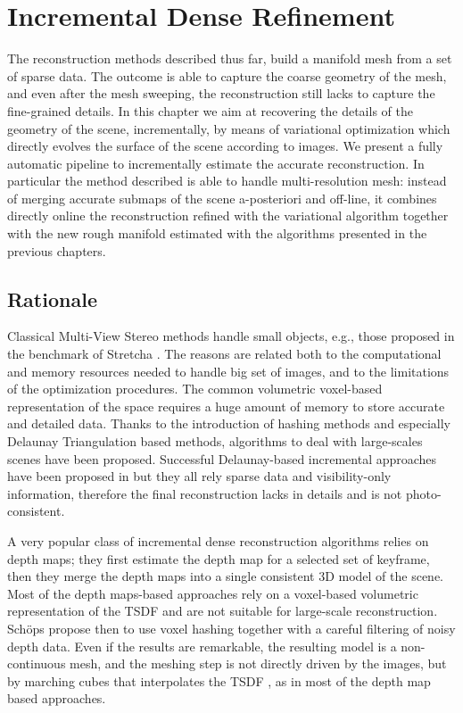 \chapter{Incremental Dense Refinement}
\label{ch:incrDenseRef}
The reconstruction methods described thus far, build a manifold mesh from a set of sparse data. 
The outcome is able to capture the coarse geometry of the mesh, and even after the mesh sweeping, the reconstruction still lacks to capture the fine-grained details.
In this chapter we aim at recovering the details of the geometry of the scene, incrementally, by means of variational optimization which directly evolves the surface of the scene according to images. 
We present a fully automatic pipeline to incrementally estimate the accurate reconstruction. In particular the method described is able to handle multi-resolution mesh: instead of merging accurate submaps of the scene a-posteriori and off-line, it combines directly online the reconstruction refined with the variational algorithm together with the new rough manifold estimated with the algorithms presented in the previous chapters.

\minitoc

\section{Rationale}

Classical Multi-View Stereo methods \cite{gargallo2005bayesian,delaunoy_et_al_08} handle small objects, e.g., those proposed in the benchmark of Stretcha \etal \cite{strecha2006combined}.
The reasons are related both to the computational and memory resources needed to handle big set of images, and to the limitations of the optimization procedures.
The common volumetric voxel-based representation of the space requires a huge amount of memory to store accurate and detailed data.
Thanks to the introduction of hashing methods and especially  Delaunay Triangulation based methods, algorithms to deal with large-scales scenes have been proposed.
Successful Delaunay-based incremental approaches have been proposed in \cite{lovi_et_al_11,hoppe2013incremental,litvinov_lhuillier_13,romanoni15b,romanoni15a} but they all rely sparse data and visibility-only information, therefore the final reconstruction lacks in details and is not photo-consistent.


A very popular class of  incremental dense reconstruction algorithms relies on depth maps; they first estimate the depth map for a selected set of keyframe, then they merge the depth maps into a single consistent 3D model of the scene. 
Most of the depth maps-based approaches \cite{pollefeys_et_al_08,collins1996space,newcombe2010live,ohtake2003multi,stuhmer2012parallel,stuckler2014multi} rely on a voxel-based volumetric representation of the TSDF and are not suitable for large-scale reconstruction. 
Sch{\"o}ps \etal \cite{schops20153d} propose then to use voxel hashing together with a careful filtering of noisy depth data.
Even if the results are remarkable, the resulting model is a non-continuous mesh, and the meshing step is not directly driven by the images, but by marching cubes \cite{lorensen1987marching} that interpolates the TSDF , as in most of the depth map based approaches.


